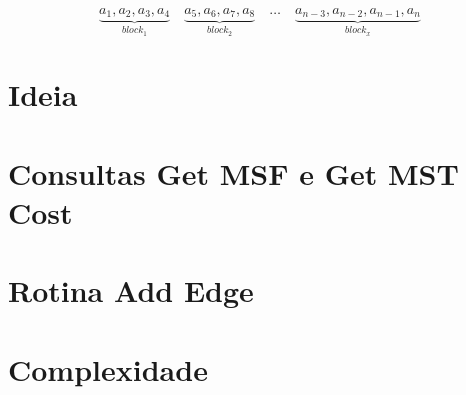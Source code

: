 
\begin{equation*}
    \underbrace{a_1, a_2, a_3, a_4}_{block_1} \quad
    \underbrace{a_5, a_6, a_7, a_8}_{block_2} \quad
    \dots \quad
    \underbrace{a_{n-3}, a_{n-2}, a_{n-1}, a_n}_{block_x}
\end{equation*}





\section{Ideia}
\label{sec:rmsf-ideia}



\section{Consultas Get MSF e Get MST Cost}
\label{sec:rmsf-get-msf}






\section{Rotina Add Edge}
\label{sec:rmsf-add-edge}



\section{Complexidade}
\label{sec:rmsf-complexidade}
